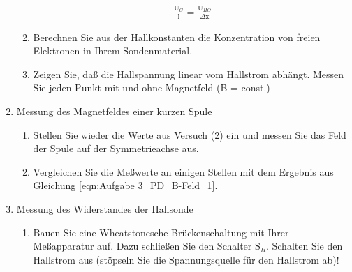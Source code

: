 \documentclass[12pt]{scrartcl}
\begin{document}
\begin{enumerate}
\begin{enumerate}
\begin{align}
\frac{\text{U}_G}{\text{l}} = \frac{\text{U}_{HO}}{\Delta\text{x}}
\label{eqn: U_H0}
\end{align}
\newline
\item
Berechnen Sie aus der Hallkonstanten die Konzentration von freien Elektronen in Ihrem Sondenmaterial.
\newline
\item
Zeigen Sie, daß die Hallspannung linear vom Hallstrom abhängt. Messen Sie
jeden Punkt mit und ohne Magnetfeld (B = const.)
\end{enumerate}
\item
Messung des Magnetfeldes einer kurzen Spule 
\newline
\begin{enumerate}
\item
Stellen Sie wieder die Werte aus Versuch (2) ein und messen Sie das Feld der Spule auf der Symmetrieachse aus.
\newline
\item
Vergleichen Sie die Meßwerte an einigen Stellen mit dem Ergebnis aus Gleichung \ref{eqn:Aufgabe 3_PD_B-Feld_1}.
\end{enumerate}
\item
Messung des Widerstandes der Hallsonde \newline
\begin{enumerate}
\item
Bauen Sie eine Wheatstonesche Brückenschaltung mit Ihrer Meßapparatur
auf. Dazu schließen Sie den Schalter
S$_R$. Schalten Sie den Hallstrom aus (stöpseln Sie die Spannungsquelle für den Hallstrom ab)!


\end{enumerate}
\end{enumerate}
\end{document}
